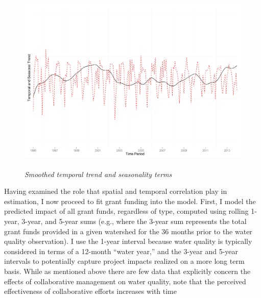 \documentclass[12pt,a4paper,titlepage]{article}
\begin{document}
\begin{figure}[!ht]
\graphicspath{ {`/Users/TScott/Google\space Drive/quinalt/APPAM_2014/'}}
\noindent
\includegraphics[trim = 4mm 3mm 5mm 18mm, clip, width=6in, height=3.5in]{timetrendplot.png}
\caption{\textit{Smoothed temporal trend and seasonality terms}}
\label{fig:timetrend}
\end{figure}

Having examined the role that spatial and temporal correlation play in estimation, I now proceed to fit grant funding into the model. First, I model the predicted impact of all grant funds, regardless of type, computed using rolling 1-year, 3-year, and 5-year sums (e.g., where the 3-year sum represents the total grant funds provided in a given watershed for the 36 months prior to the water quality observation). I use the 1-year interval because water quality is typically considered in terms of a 12-month ``water year,'' and the 3-year and 5-year intervals to potentially capture project impacts realized on a more long term basis. While as mentioned above there are few data that explicitly concern the effects of collaborative management on water quality, \textcite[][p. 281]{lubell2009} note that the perceived effectiveness of collaborative efforts increases with time \parencite[see also][]{leach2002, leach2006}
\end{document}
